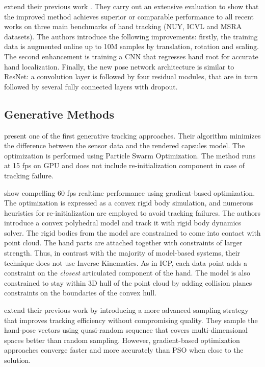 \hspace{-0.4em}
\textbf{\cite{oberweger2017deepprior++}} 
extend their previous work \cite{oberweger2015hands}. They carry out an extensive evaluation to show that the improved method achieves superior or comparable performance to all recent works on three main benchmarks of hand tracking (NUY, ICVL and MSRA datasets). The authors introduce the following improvements: firstly, the training data is augmented online up to 10M samples by translation, rotation and scaling. The second enhancement is training a CNN that regresses hand root for accurate hand localization. Finally, the new pose network architecture is similar to ResNet: a convolution layer is followed by four residual modules, that are in turn followed by several fully connected layers with dropout.

\subsection{Generative Methods}

\hspace{-0.4em}
\textbf{\cite{oiko2011hand}} 
present one of the first generative tracking approaches. Their algorithm minimizes the difference between the sensor data and the rendered capsules model. The optimization is performed using Particle Swarm Optimization. The method runs at 15 fps on GPU and does not include re-initialization component in case of tracking failure.

\hspace{-0.4em}
\textbf{\cite{melax2013dynamics}} 
show compelling 60 fps realtime performance using gradient-based optimization. The optimization is expressed as a convex rigid body simulation, and numerous heuristics for re-initialization are employed to avoid tracking failures. The authors introduce a convex polyhedral model and track it with rigid body dynamics solver. The rigid bodies from the model are constrained to come into contact with point cloud. The hand parts are attached together with constraints of larger strength. Thus, in contrast with the majority of model-based systems, their technique does not use Inverse Kinematics. As in ICP, each data point adds a constraint on the \textit{closest} articulated component of the hand. The model is also constrained to stay within 3D hull of the point cloud by adding collision planes constraints on the boundaries of the convex hull.

\hspace{-0.4em}
\textbf{\cite{oikonomidis2014evolutionary}} 
extend their previous work \cite{oiko2011hand} by introducing a more advanced sampling strategy that improves tracking efficiency without compromising quality. They sample the hand-pose vectors using quasi-random sequence that covers multi-dimensional spaces better than random sampling. However, gradient-based optimization approaches converge faster and more accurately than PSO when close to the solution.

